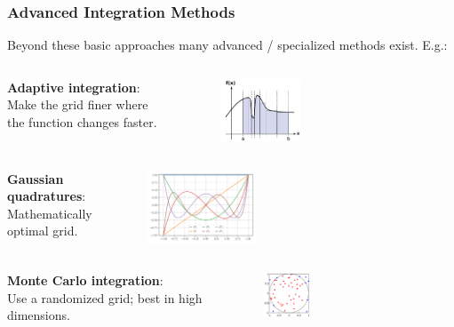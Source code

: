 \documentclass[11pt,aspectratio=169,handout]{beamer}
\begin{document}
\begin{frame}
	\frametitle{Advanced Integration Methods}
	Beyond these basic approaches many advanced / specialized methods exist. E.g.:
	\pause
	\begin{columns}
		\textbf{Adaptive integration}: \\
		Make the grid finer where the function changes faster.
		\begin{figure}
			\centering
			\includegraphics[width=0.4\textwidth]{fig/integration-adaptive}
		\end{figure}%
	\end{columns}
	
	\pause
	\begin{columns}
		\column{0.6\textwidth}
		\textbf{Gaussian quadratures}: \\
		Mathematically optimal grid.
		\column{0.4\textwidth}
		\begin{figure}
			\centering
			\includegraphics[width=0.4\textwidth]{fig/integration-legendre}
		\end{figure}%
	\end{columns}
	
	\pause
	\begin{columns}
		\textbf{Monte Carlo integration}: \\
		Use a randomized grid; best in high dimensions.
		\begin{figure}
			\centering
			\includegraphics[width=0.3\textwidth]{fig/integration-monte-carlo}
		\end{figure}%
	\end{columns}
	
\end{frame}
\end{document}
